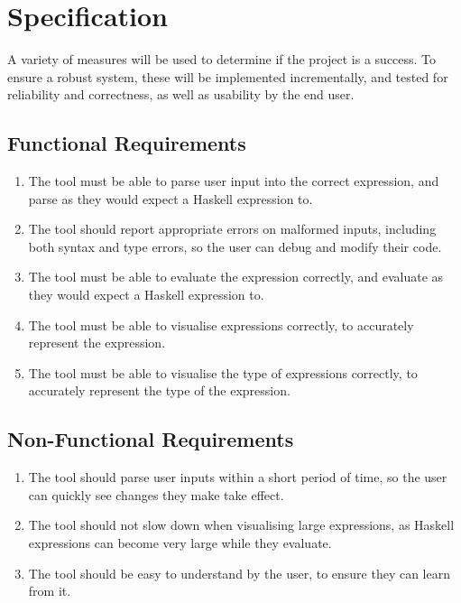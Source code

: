 \section{Specification} \label{specification}
A variety of measures will be used to determine if the project is a success. To ensure a robust system, these will be implemented incrementally, and tested for reliability and correctness, as well as usability by the end user.

\subsection{Functional Requirements} \label{functional-requirements}
\begin{enumerate}
    \item The tool must be able to parse user input into the correct expression, and parse as they would expect a Haskell expression to.
    \item The tool should report appropriate errors on malformed inputs, including both syntax and type errors, so the user can debug and modify their code.
    \item The tool must be able to evaluate the expression correctly, and evaluate as they would expect a Haskell expression to.
    \item The tool must be able to visualise expressions correctly, to accurately represent the expression.
    \item The tool must be able to visualise the type of expressions correctly, to accurately represent the type of the expression.
\end{enumerate}

\subsection{Non-Functional Requirements} \label{non-functional-requirements}
\begin{enumerate}
    \item The tool should parse user inputs within a short period of time, so the user can quickly see changes they make take effect.
    \item The tool should not slow down when visualising large expressions, as Haskell expressions can become very large while they evaluate.
    \item The tool should be easy to understand by the user, to ensure they can learn from it.
\end{enumerate}